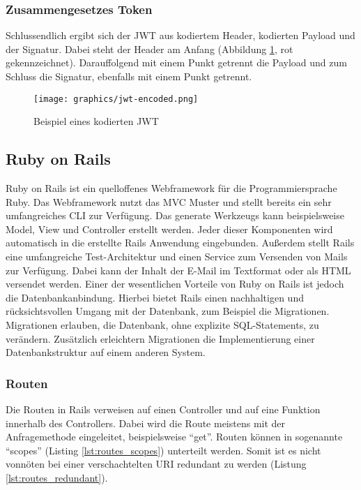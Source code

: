 \subsubsection{Zusammengesetzes Token}
\label{sec: jwt_result}
Schlussendlich ergibt sich der \gls{JWT} aus kodiertem Header, kodierten Payload und der Signatur. Dabei steht der Header am Anfang (Abbildung \ref{fig:jwt-encoded}, rot gekennzeichnet). Darauffolgend mit einem Punkt getrennt die Payload und zum Schluss die Signatur, ebenfalls mit einem Punkt getrennt.

\begin{figure}[h]
	\centering
	\texttt{[image: graphics/jwt-encoded.png]}
	\caption{Beispiel eines kodierten \gls{JWT} }
	\label{fig:jwt-encoded}
\end{figure}

\subsection{Ruby on Rails}
\label{sec: rails}
Ruby on Rails ist ein quelloffenes Webframework für die Programmiersprache Ruby. Das Webframework nutzt das \gls{MVC} Muster und stellt bereits ein sehr umfangreiches \gls{CLI} zur Verfügung. Das generate Werkzeugs kann beispielsweise Model, View und Controller erstellt werden. Jeder dieser Komponenten wird automatisch in die erstellte Rails Anwendung eingebunden. Au{\ss}erdem stellt Rails eine umfangreiche Test-Architektur und einen Service zum Versenden von Mails zur Verfügung. Dabei kann der Inhalt der E-Mail im Textformat oder als \gls{HTML} versendet werden. Einer der wesentlichen Vorteile von Ruby on Rails ist jedoch die Datenbankanbindung. Hierbei bietet Rails einen nachhaltigen und rücksichtsvollen Umgang mit der Datenbank, zum Beispiel die Migrationen. Migrationen erlauben, die Datenbank, ohne explizite SQL-Statements, zu verändern. Zusätzlich erleichtern Migrationen die Implementierung einer Datenbankstruktur auf einem anderen System.

\subsubsection{Routen}
\label{sec: routen}
Die Routen in Rails verweisen auf einen Controller und auf eine Funktion innerhalb des Controllers. Dabei wird die Route meistens mit der Anfragemethode eingeleitet, beispielsweise \enquote{get}. Routen können in sogenannte \enquote{scopes} (Listing \ref{lst:routes_scopes}) unterteilt werden. Somit ist es nicht vonnöten bei einer verschachtelten \gls{URI} redundant zu werden (Listung \ref{lst:routes_redundant}).


